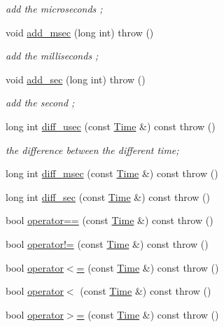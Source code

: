 \begin{DoxyCompactItemize}
\begin{DoxyCompactList}\small\item\em add the microseconds ; \end{DoxyCompactList}\item 
void \hyperlink{classnubot_1_1Time_a5ebb3c5af685232553a0082917df7fa2}{add\-\_\-msec} (long int)  throw ()
\begin{DoxyCompactList}\small\item\em add the milliseconds ; \end{DoxyCompactList}\item 
void \hyperlink{classnubot_1_1Time_ad8378fc95552047a2bf8cf84fda57822}{add\-\_\-sec} (long int)  throw ()
\begin{DoxyCompactList}\small\item\em add the second ; \end{DoxyCompactList}\item 
long int \hyperlink{classnubot_1_1Time_ac1d4a23ba198272c24e22375754a0309}{diff\-\_\-usec} (const \hyperlink{classnubot_1_1Time}{Time} \&) const   throw ()
\begin{DoxyCompactList}\small\item\em the difference between the different time; \end{DoxyCompactList}\item 
long int \hyperlink{classnubot_1_1Time_a37f7fa2e286c1bff7ad8cabb767b151a}{diff\-\_\-msec} (const \hyperlink{classnubot_1_1Time}{Time} \&) const   throw ()
\item 
long int \hyperlink{classnubot_1_1Time_abdd3b9c043054674c9e1c8630bb3cc8c}{diff\-\_\-sec} (const \hyperlink{classnubot_1_1Time}{Time} \&) const   throw ()
\item 
bool \hyperlink{classnubot_1_1Time_a67cccd0ef45f417708e39aba6c8445ce}{operator==} (const \hyperlink{classnubot_1_1Time}{Time} \&) const   throw ()
\item 
bool \hyperlink{classnubot_1_1Time_a0b4b0ee6ebbaa62cf5c48943a8e853a6}{operator!=} (const \hyperlink{classnubot_1_1Time}{Time} \&) const   throw ()
\item 
bool \hyperlink{classnubot_1_1Time_aff915527aeab60210d8340a22d611d23}{operator$<$=} (const \hyperlink{classnubot_1_1Time}{Time} \&) const   throw ()
\item 
bool \hyperlink{classnubot_1_1Time_af122ee2cf5e5bf2ea75e72576cab432d}{operator$<$} (const \hyperlink{classnubot_1_1Time}{Time} \&) const   throw ()
\item 
bool \hyperlink{classnubot_1_1Time_a02e43a52ecefa9cc92cbc14afafa4645}{operator$>$=} (const \hyperlink{classnubot_1_1Time}{Time} \&) const   throw ()

\end{DoxyCompactItemize}
